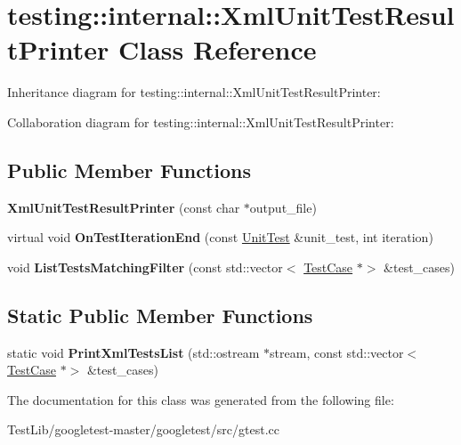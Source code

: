 \hypertarget{classtesting_1_1internal_1_1XmlUnitTestResultPrinter}{}\section{testing\+:\+:internal\+:\+:Xml\+Unit\+Test\+Result\+Printer Class Reference}
\label{classtesting_1_1internal_1_1XmlUnitTestResultPrinter}


Inheritance diagram for testing\+:\+:internal\+:\+:Xml\+Unit\+Test\+Result\+Printer\+:


Collaboration diagram for testing\+:\+:internal\+:\+:Xml\+Unit\+Test\+Result\+Printer\+:
\subsection*{Public Member Functions}
\begin{DoxyCompactItemize}
\item 
\mbox{\label{classtesting_1_1internal_1_1XmlUnitTestResultPrinter_afdaf88e6764c18ce0dcc3733d7a06e31}} 
{\bfseries Xml\+Unit\+Test\+Result\+Printer} (const char $\ast$output\+\_\+file)
\item 
\mbox{\label{classtesting_1_1internal_1_1XmlUnitTestResultPrinter_a2ae986dd2f4f2aed31cc6f3bc8c56898}} 
virtual void {\bfseries On\+Test\+Iteration\+End} (const \hyperlink{classtesting_1_1UnitTest}{Unit\+Test} \&unit\+\_\+test, int iteration)
\item 
\mbox{\label{classtesting_1_1internal_1_1XmlUnitTestResultPrinter_a0f0e0bd707d7aed5c008346d7fa95125}} 
void {\bfseries List\+Tests\+Matching\+Filter} (const std\+::vector$<$ \hyperlink{classtesting_1_1TestCase}{Test\+Case} $\ast$$>$ \&test\+\_\+cases)
\end{DoxyCompactItemize}
\subsection*{Static Public Member Functions}
\begin{DoxyCompactItemize}
\item 
\mbox{\label{classtesting_1_1internal_1_1XmlUnitTestResultPrinter_ad202babf81b4b6d6d2f98df1e27a2d50}} 
static void {\bfseries Print\+Xml\+Tests\+List} (std\+::ostream $\ast$stream, const std\+::vector$<$ \hyperlink{classtesting_1_1TestCase}{Test\+Case} $\ast$$>$ \&test\+\_\+cases)
\end{DoxyCompactItemize}


The documentation for this class was generated from the following file\+:\begin{DoxyCompactItemize}
\item 
Test\+Lib/googletest-\/master/googletest/src/gtest.\+cc\end{DoxyCompactItemize}

